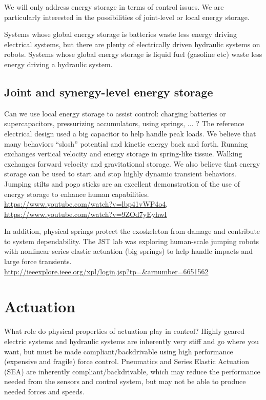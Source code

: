 \documentclass[letterpaper,12pt,fullpage]{article}
\begin{document}
We will only address energy storage
in terms of control issues. We are particularly interested in the
possibilities of joint-level or local energy storage.

Systems whose global energy storage is batteries waste
less energy driving electrical systems, but there are plenty of electrically
driven hydraulic systems on robots.
Systems whose global energy storage is liquid fuel (gasoline etc)
waste less energy driving a hydraulic system.

\subsection{Joint and synergy-level energy storage}

Can we use local energy storage to assist control: charging batteries or
supercapacitors, pressurizing accumulators, using springs, ... ?
The reference electrical design used a big capacitor to help handle
peak loads. We believe that many behaviors ``slosh'' potential and
kinetic energy back and forth.
Running exchanges vertical velocity and energy storage in spring-like
tissue.
Walking exchanges forward velocity and gravitational storage.
We also believe that energy storage can be used to start and stop
highly dynamic transient behaviors.
Jumping stilts and pogo sticks are an excellent demonstration
of the use of energy storage to enhance human
capabilities.\\
\url{https://www.youtube.com/watch?v=lbp41vWP4o4},\\
\url{https://www.youtube.com/watch?v=9ZOd7yEyhwI}

In addition, physical springs protect the exoskeleton from damage
and contribute to system dependability.
The JST lab was exploring human-scale jumping robots
with 
nonlinear series elastic actuation (big springs)
to help handle impacts and large force
transients.\\
\url{http://ieeexplore.ieee.org/xpl/login.jsp?tp=&arnumber=6651562}\\

\section{Actuation}

What role do physical properties of actuation play in control? Highly
geared electric systems and hydraulic systems are inherently very
stiff and go where you want, but must be made compliant/backdrivable
using high performance (expensive and fragile) force control.
Pneumatics and Series Elastic Actuation (SEA) are inherently
compliant/backdrivable, which may reduce the performance
needed from the sensors and control system, but may not be able to
produce needed forces and speeds.
\end{document}
